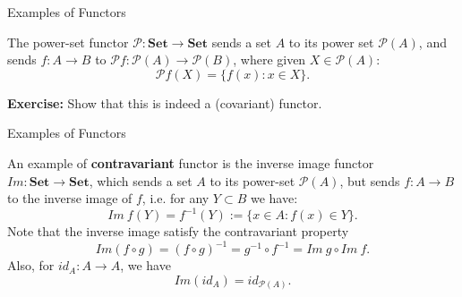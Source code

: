\documentclass[aspectratio=169,xcolor=dvipsnames,10pt]{beamer}
\theoremstyle{definition}
\begin{document}
\begin{frame}[fragile]{Examples of Functors}
    \begin{definition}
        The power-set functor $\mathcal P : \mathbf{Set} \to \mathbf{Set}$ sends a set $A$
        to its power set $\mathcal P (A)$, and sends $f:A\to B$ to 
        $\mathcal P f : \mathcal P(A) \to \mathcal P(B)$, where given $X \in \mathcal P (A)$:
        $$
            \mathcal P f (X) = \{f(x) : x \in X\}.
        $$

        \textbf{Exercise:} Show that this is indeed a (covariant) functor.
    \end{definition}
\end{frame}

\begin{frame}[fragile]{Examples of Functors}
    \begin{definition}
        An example of \textbf{contravariant} functor is the inverse image functor
        $Im : \mathbf{Set} \to \mathbf{Set}$, which sends a set $A$ to its
        power-set $\mathcal P(A)$, but sends $f:A\to B$ to the inverse image of $f$, i.e.
        for any $Y \subset B$ we have:
        $$
            Im \ f(Y) = f^{-1}(Y) := \{x \in A : f(x) \in Y\}.
        $$
        Note that the inverse image satisfy the contravariant property
        \begin{displaymath}
            Im(f \circ g) = (f \circ g) ^{-1} = g^{-1} \circ f^{-1} = Im \ g \circ Im \ f.
        \end{displaymath}
        Also, for $id_A: A \to A$, we have
        \begin{displaymath}
            Im(id_A) = id_{\mathcal P (A)}.
        \end{displaymath}
    \end{definition}
\end{frame}
\end{document}
